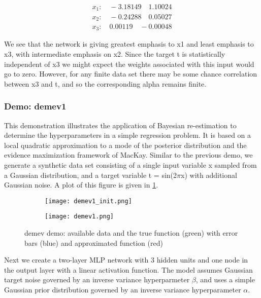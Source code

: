 \documentclass[paper=a4, fontsize=11pt]{scrartcl} %
\numberwithin{equation}{section} %
\begin{document}
\begin{align*}
x_1: \quad -3.18149 \quad 1.10024 \\
x_2: \quad -0.24288 \quad 0.05027 \\
x_3: \quad  0.00119 \quad -0.00048
\end{align*} 
 
We see that the network is giving greatest emphasis to x1 and least emphasis to x3, with intermediate emphasis on x2. Since the target t is statistically independent of x3 we might expect the weights associated with this input would go to zero. However, for any finite data set there may be some chance correlation between x3 and t, and so the corresponding alpha remains finite.

\subsubsection*{Demo: demev1}

This demonstration illustrates the application of Bayesian re-estimation to determine the hyperparameters in a simple regression problem. It is based on a local quadratic approximation to a mode of the posterior distribution and the evidence maximization framework of MacKay. Similar to the previous demo, we generate a synthetic data set consisting of a single input variable x sampled from a Gaussian distribution, and a target variable t = sin(2$\pi$x) with additional Gaussian noise. A plot of this figure is given in \ref{demev}.\\

\begin{figure}[ht]
	\begin{subfigure}[b]{0.5\textwidth}
	\centering
	\texttt{[image: demev1\_init.png]}
	\end{subfigure}
	\begin{subfigure}[b]{0.5\textwidth}
	\centering
	\texttt{[image: demev1.png]}
	\end{subfigure}
	\caption{demev demo: available data and the true function (green) with error bars (blue) and approximated function (red)}
\label{demev}
\end{figure}

Next we create a two-layer MLP network with 3 hidden units and one node in the output layer with a linear activation function. The model assumes Gaussian target noise governed by an inverse variance hyperparmeter $\beta$, and uses a simple Gaussian prior distribution governed by an inverse variance hyperparameter $\alpha$.\\
 
\end{document}
